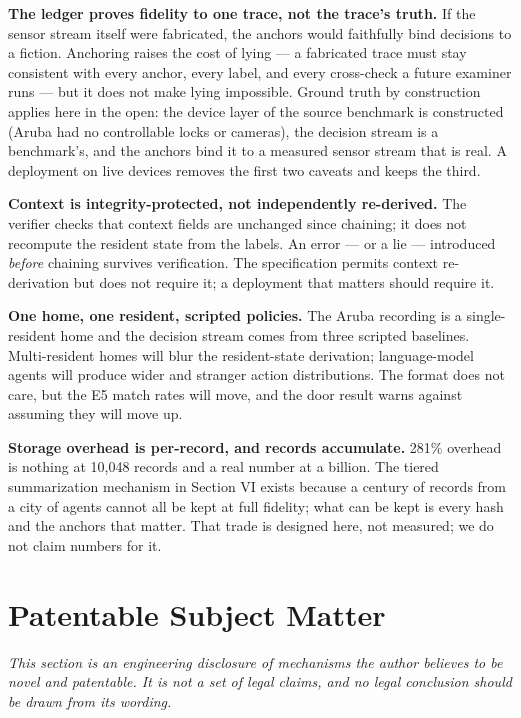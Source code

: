 \documentclass[journal]{IEEEtran}
\begin{document}
\textbf{The ledger proves fidelity to one trace, not the trace's
truth.} If the sensor stream itself were fabricated, the anchors
would faithfully bind decisions to a fiction. Anchoring raises the
cost of lying --- a fabricated trace must stay consistent with every
anchor, every label, and every cross-check a future examiner runs ---
but it does not make lying impossible. Ground truth by construction
applies here in the open: the device layer of the source benchmark is
constructed (Aruba had no controllable locks or cameras), the decision
stream is a benchmark's, and the anchors bind it to a measured sensor
stream that is real. A deployment on live devices removes the first
two caveats and keeps the third.

\textbf{Context is integrity-protected, not independently re-derived.}
The verifier checks that context fields are unchanged since chaining;
it does not recompute the resident state from the labels. An error
--- or a lie --- introduced \emph{before} chaining survives
verification. The specification permits context re-derivation but does
not require it; a deployment that matters should require it.

\textbf{One home, one resident, scripted policies.} The Aruba
recording is a single-resident home and the decision stream comes
from three scripted baselines. Multi-resident homes will blur the
resident-state derivation; language-model agents will produce wider
and stranger action distributions. The format does not care, but the
E5 match rates will move, and the door result warns against assuming
they will move up.

\textbf{Storage overhead is per-record, and records accumulate.}
281\% overhead is nothing at 10,048 records and a real number at a
billion. The tiered summarization mechanism in Section VI exists
because a century of records from a city of agents cannot all be kept
at full fidelity; what can be kept is every hash and the anchors that
matter. That trade is designed here, not measured; we do not claim
numbers for it.

\section{Patentable Subject Matter}

\emph{This section is an engineering disclosure of mechanisms the
author believes to be novel and patentable. It is not a set of legal
claims, and no legal conclusion should be drawn from its wording.}
\end{document}

